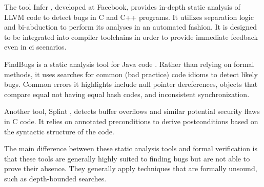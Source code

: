 The tool Infer \autocite{calcagno2011infer}, developed at Facebook,
provides in-depth static analysis of LLVM code to detect bugs in C and C++ programs.
It utilizes separation logic  \autocite{reynolds2002separation}
and bi-abduction to perform its analyses in an automated fashion.
It is designed to be integrated into compiler toolchains
in order to provide immediate feedback even in \ac{ci} scenarios.

FindBugs is a static analysis tool for Java code \autocite{hovemeyer2004findbugs}.
Rather than relying on formal methods,
it uses searches for common (bad practice) code idioms to detect likely bugs.
Common errors it highlights include null pointer dereferences,
objects that compare equal not having equal hash codes,
and inconsistent synchronization.

Another tool, Splint \autocite{evans2002static}, detects buffer overflows
and similar potential security flaws in C code.
It relies on annotated preconditions to derive postconditions
based on the syntactic structure of the code.

The main difference between these static analysis tools and formal verification
is that these tools are generally highly suited to finding bugs
but are not able to prove their absence.
They generally apply techniques that are formally unsound, such as depth-bounded searches.

